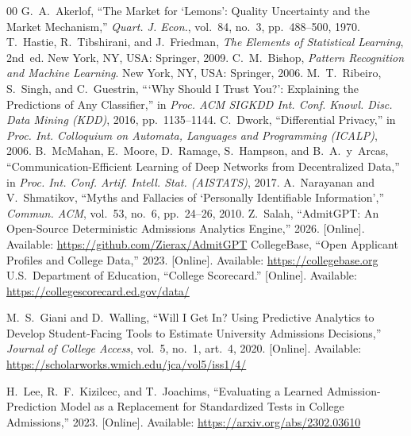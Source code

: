\documentclass[conference]{IEEEtran}
\begin{document}
\begin{thebibliography}{00}
 G.~A.~Akerlof, ``The Market for `Lemons': Quality Uncertainty and the Market Mechanism,'' \textit{Quart. J. Econ.}, vol.~84, no.~3, pp.~488--500, 1970.
 T.~Hastie, R.~Tibshirani, and J.~Friedman, \textit{The Elements of Statistical Learning}, 2nd~ed. New York, NY, USA: Springer, 2009.
 C.~M.~Bishop, \textit{Pattern Recognition and Machine Learning}. New York, NY, USA: Springer, 2006.
 M.~T.~Ribeiro, S.~Singh, and C.~Guestrin, ```Why Should I Trust You?': Explaining the Predictions of Any Classifier,'' in \textit{Proc. ACM SIGKDD Int. Conf. Knowl. Disc. Data Mining (KDD)}, 2016, pp.~1135--1144.
 C.~Dwork, ``Differential Privacy,'' in \textit{Proc. Int. Colloquium on Automata, Languages and Programming (ICALP)}, 2006.
 B.~McMahan, E.~Moore, D.~Ramage, S.~Hampson, and B.~A.~y~Arcas, ``Communication-Efficient Learning of Deep Networks from Decentralized Data,'' in \textit{Proc. Int. Conf. Artif. Intell. Stat. (AISTATS)}, 2017.
 A.~Narayanan and V.~Shmatikov, ``Myths and Fallacies of `Personally Identifiable Information','' \textit{Commun. ACM}, vol.~53, no.~6, pp.~24--26, 2010.
 Z.~Salah, ``AdmitGPT: An Open-Source Deterministic Admissions Analytics Engine,'' 2026. [Online]. Available: \url{https://github.com/Zierax/AdmitGPT}
 CollegeBase, ``Open Applicant Profiles and College Data,'' 2023. [Online]. Available: \url{https://collegebase.org}
 U.S.~Department of Education, ``College Scorecard.'' [Online]. Available: \url{https://collegescorecard.ed.gov/data/}

 M.~S.~Giani and D.~Walling, ``Will I Get In? Using Predictive Analytics to Develop Student-Facing Tools to Estimate University Admissions Decisions,'' \textit{Journal of College Access}, vol.~5, no.~1, art.~4, 2020. [Online]. Available: \url{https://scholarworks.wmich.edu/jca/vol5/iss1/4/}

 H.~Lee, R.~F.~Kizilcec, and T.~Joachims, ``Evaluating a Learned Admission-Prediction Model as a Replacement for Standardized Tests in College Admissions,'' 2023. [Online]. Available: \url{https://arxiv.org/abs/2302.03610}
\end{thebibliography}
\end{document}

